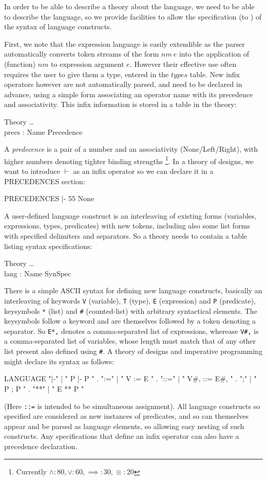 In order to be able to describe a theory about the language,
we need to be able to describe the language,
so we provide facilities to allow the specification (to \STHN)
of the syntax of language constructs.

First, we note that the expression language is easily extendible
as the parser automatically converts token streams of the form $nm~e$
into the application of (function) $nm$ to expression argument $e$.
However their effective use often requires the user to give them a type,
entered in the $types$ table.
New infix operators however are not automatically parsed,
and need to be declared in advance, using a simple form associating
an operator name with its precedence and associativity.
This infix information is stored in a table in the theory:
\begin{schema}{Theory}
   \ldots
\\ precs : Name \pfun Precedence
\end{schema}
A \emph{predecence} is a pair of a number and an associativity (None/Left/Right),
with higher numbers denoting tighter binding strengths%
\footnote{Currently $\land:80, \lor:60, \implies:30, \equiv:20$}.
In a theory of designs, we want to introduce $\vdash$ as an infix operator
so we can declare it in a PRECEDENCES section:
\begin{haskell}
PRECEDENCES
 |- 55 None
\end{haskell}
A user-defined language construct is an interleaving of existing forms (variables, expressions, types, predicates)
with new tokens, including also some list forms with specified delimiters and separators.
So a theory needs to contain a table listing syntax specifications:
\begin{schema}{Theory}
   \ldots
\\ lang : Name \pfun SynSpec
\end{schema}
There is a simple ASCII syntax for defining new language constructs,
basically an interleaving of keywords
\verb"V" (variable),
\verb"T" (type),
 \verb"E" (expression) and \verb"P" (predicate),
keysymbols \verb"*" (list) and \verb"#" (counted-list)
with arbitrary syntactical elements.
The keysymbols follow a keyword and are themselves followed
by a token denoting a separator.
So \verb"E*," denotes a comma-separated list of expressions,
wherease \verb"V#," is a comma-separated list of variables,
whose length must match that of any other list present
also defined using \verb"#".
A theory of designs and imperative programming might declare its
syntax as follows:
\begin{haskell}
LANGUAGE
  "|-"   | " P |- P " .
  ":="   | " V := E " .
  "::="  | " V#, ::= E#, " .
  ";"    | " P ; P " .
  "**"   | " E ** P "
\end{haskell}
(Here \verb"::=" is intended to be simultaneous assignment).
All language constructs so specified are considered as new instances
of predicates, and so can themselves appear and be parsed as language elements,
so allowing easy nesting of such constructs.
Any specifications that define an infix operator can also have a precedence
declaration.

